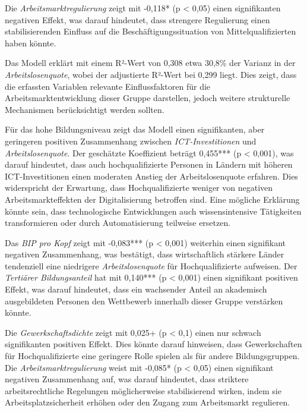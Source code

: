 Die \textit{Arbeitsmarktregulierung} zeigt mit -0,118* (p < 0,05) einen signifikanten negativen 
Effekt, was darauf hindeutet, dass strengere Regulierung einen stabilisierenden Einfluss auf die 
Beschäftigungssituation von Mittelqualifizierten haben könnte. 

Das Modell erklärt mit einem R²-Wert von 0,308 etwa 30,8\% der Varianz in der 
\textit{Arbeitslosenquote}, wobei der adjustierte R²-Wert bei 0,299 liegt. Dies zeigt, dass die 
erfassten Variablen relevante Einflussfaktoren für die Arbeitsmarktentwicklung dieser Gruppe 
darstellen, jedoch weitere strukturelle Mechanismen berücksichtigt werden sollten.

Für das hohe Bildungsniveau zeigt das Modell einen signifikanten, aber geringeren positiven 
Zusammenhang zwischen \textit{\ac{ICT}-Investitionen} und \textit{Arbeitslosenquote}. Der 
geschätzte Koeffizient beträgt 0,455*** (p < 0,001), was darauf hindeutet, dass auch 
hochqualifizierte Personen in Ländern mit höheren \ac{ICT}-Investitionen einen moderaten Anstieg 
der Arbeitslosenquote erfahren. Dies widerspricht der Erwartung, dass Hochqualifizierte weniger 
von negativen Arbeitsmarkteffekten der Digitalisierung betroffen sind. Eine mögliche Erklärung 
könnte sein, dass technologische Entwicklungen auch wissensintensive Tätigkeiten transformieren 
oder durch Automatisierung teilweise ersetzen.

Das \textit{\ac{BIP} pro Kopf} zeigt mit -0,083*** (p < 0,001) weiterhin einen signifikant 
negativen Zusammenhang, was bestätigt, dass wirtschaftlich stärkere Länder tendenziell eine 
niedrigere \textit{Arbeitslosenquote} für Hochqualifizierte aufweisen. Der 
\textit{Tertiärer Bildungsanteil} hat mit 0,140*** (p < 0,001) einen signifikant positiven 
Effekt, was darauf hindeutet, dass ein wachsender Anteil an akademisch ausgebildeten Personen den 
Wettbewerb innerhalb dieser Gruppe verstärken könnte.

Die \textit{Gewerkschaftsdichte} zeigt mit 0,025+ (p < 0,1) einen nur schwach signifikanten 
positiven Effekt. Dies könnte darauf hinweisen, dass Gewerkschaften für Hochqualifizierte eine 
geringere Rolle spielen als für andere Bildungsgruppen. Die \textit{Arbeitsmarktregulierung} 
weist mit -0,085* (p < 0,05) einen signifikant negativen Zusammenhang auf, was darauf hindeutet, 
dass striktere arbeitsrechtliche Regelungen möglicherweise stabilisierend wirken, indem sie 
Arbeitsplatzsicherheit erhöhen oder den Zugang zum Arbeitsmarkt regulieren.

